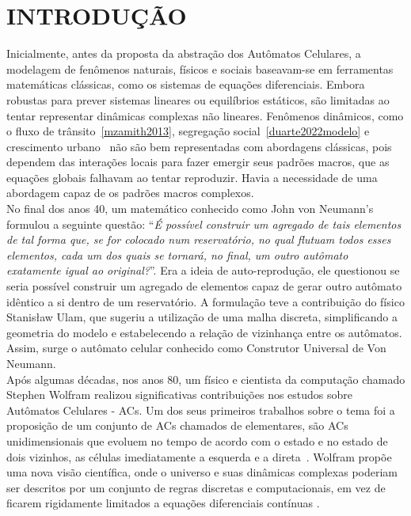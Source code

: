 \chapter{INTRODUÇÃO}
\label{cap:introducao}
Inicialmente, antes da proposta da abstração dos Autômatos Celulares, a modelagem de fenômenos naturais, físicos e sociais baseavam-se  em ferramentas matemáticas clássicas, como os sistemas de equações diferenciais. Embora robustas para prever sistemas lineares ou equilíbrios estáticos, são limitadas ao tentar representar dinâmicas complexas não lineares. Fenômenos dinâmicos, como o fluxo de trânsito~\ref{mzamith2013}, segregação social~\ref{duarte2022modelo} e crescimento urbano~\cite{white1993cellular} não são bem representadas com abordagens clássicas, pois dependem das interações locais para fazer emergir seus padrões macros, que as equações globais falhavam ao tentar reproduzir. Havia a necessidade de uma abordagem capaz de os padrões macros complexos.\\

No final dos anos 40, um matemático conhecido como John von Neumann's formulou a seguinte questão: ``\textit{É possível construir um agregado de tais elementos de tal forma que, se for colocado num reservatório, no qual flutuam todos esses elementos, cada um dos quais se tornará, no final, um outro autômato exatamente igual ao original?}''. Era a ideia de auto-reprodução, ele  questionou se seria possível construir um agregado de elementos capaz de gerar outro autômato idêntico a si dentro de um reservatório. A formulação teve a contribuição do físico Stanisław Ulam, que sugeriu a utilização de uma malha discreta, simplificando a geometria do modelo e estabelecendo a relação de vizinhança entre os autômatos. Assim, surge o autômato celular conhecido como Construtor Universal de Von Neumann.\\

Após algumas décadas, nos anos 80, um físico e cientista da computação chamado  Stephen Wolfram realizou significativas contribuições nos estudos sobre Autômatos Celulares - ACs. Um dos seus primeiros trabalhos sobre o tema foi a proposição de um conjunto de ACs chamados de elementares, são ACs unidimensionais que evoluem no tempo de acordo com o estado e no estado de dois vizinhos, as células imediatamente a esquerda e a direta~\cite{wolfram1983statistical}. Wolfram propõe uma nova visão científica, onde o universo e suas dinâmicas complexas poderiam ser descritos por um conjunto de regras discretas e computacionais, em vez de ficarem rigidamente limitados a equações diferenciais contínuas \cite{wolfram2002new,schiff2011cellular}.\\

